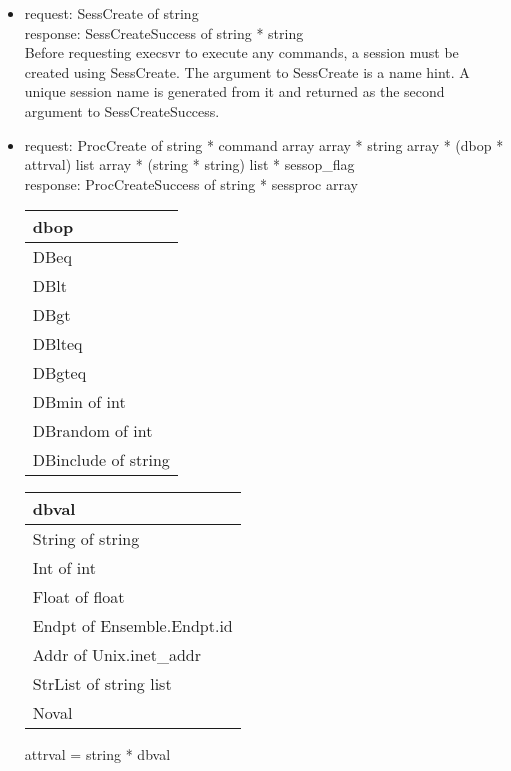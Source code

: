 \begin{itemize}
\item request: SessCreate of string\\
   response: SessCreateSuccess of string * string\\

Before requesting execsvr to execute any commands, a session must
be created using SessCreate.  The argument to SessCreate is a name hint.
A unique session name is generated from it and returned as the second
argument to SessCreateSuccess.


\item request: ProcCreate of string * command array array * string array
     * (dbop * attrval) list array * (string * string) list * sessop\_flag\\
   response: ProcCreateSuccess of string * sessproc array\\

\begin{center}
\begin{tabular}{|l|}	   \hline
dbop	 \\ \hline
DBeq \\
DBlt \\
DBgt \\
DBlteq \\
DBgteq \\
DBmin of int \\
DBrandom of int \\
DBinclude of string \\ \hline
\end{tabular}
\end{center}

\begin{center}
\begin{tabular}{|l|}	   \hline
dbval	 \\ \hline
String of string \\
Int of int \\
Float of float \\
Endpt of Ensemble.Endpt.id \\
Addr of Unix.inet\_addr \\
StrList of string list \\
Noval \\ \hline
\end{tabular}
\end{center}

\begin{center}
attrval = string * dbval
\end{center}
   

\end{itemize}
